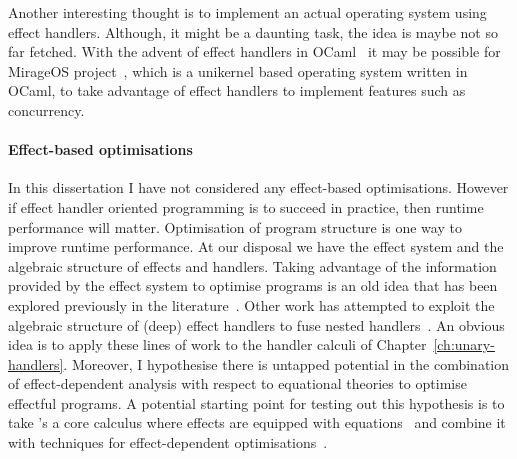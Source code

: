 \documentclass[12pt,phd,lfcs,twoside,openright,logo,leftchapter,normalheadings]{infthesis}
\theoremstyle{plain}
\theoremstyle{definition}
\begin{document}
Another interesting thought is to implement an actual operating system
using effect handlers. Although, it might be a daunting task, the idea
is maybe not so far fetched. With the advent of effect handlers in
OCaml~\cite{SivaramakrishnanDWKJM21} it may be possible for MirageOS
project~\cite{MadhavapeddyS14}, which is a unikernel based operating
system written in OCaml, to take advantage of effect handlers to
implement features such as concurrency.

\paragraph{Effect-based optimisations} In this dissertation I have not
considered any effect-based optimisations. However if effect handler
oriented programming is to succeed in practice, then runtime
performance will matter. Optimisation of program structure is one way
to improve runtime performance. At our disposal we have the effect
system and the algebraic structure of effects and handlers.
%
Taking advantage of the information provided by the effect system to
optimise programs is an old idea that has been explored previously in
the literature~\cite{KammarP12,Kammar14,Saleh19}.
%
Other work has attempted to exploit the algebraic structure of (deep)
effect handlers to fuse nested handlers~\cite{WuS15}.
%
An obvious idea is to apply these lines of work to the handler calculi
of Chapter~\ref{ch:unary-handlers}.
%
Moreover, I hypothesise there is untapped potential in the combination
of effect-dependent analysis with respect to equational theories to
optimise effectful programs. A potential starting point for testing
out this hypothesis is to take \citeauthor{LuksicP20}'s a core
calculus where effects are equipped with equations~\cite{LuksicP20}
and combine it with techniques for effect-dependent
optimisations~\cite{KammarP12}.
\end{document}
